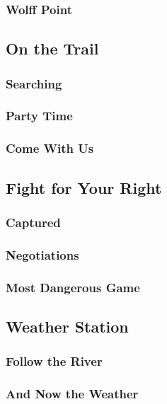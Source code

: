 \subsubsection{Wolff Point}


\subsection{On the Trail}


\subsubsection{Searching}


\subsubsection{Party Time}


\subsubsection{Come With Us}


\subsection{Fight for Your Right}


\subsubsection{Captured}


\subsubsection{Negotiations}


\subsubsection{Most Dangerous Game}


\subsection{Weather Station}


\subsubsection{Follow the River}


\subsubsection{And Now the Weather}

